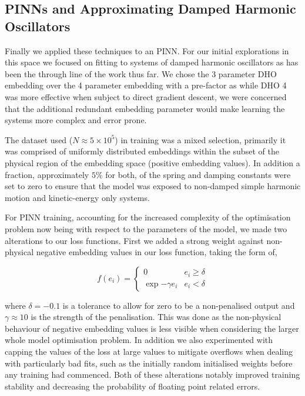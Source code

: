 \subsection{PINNs and Approximating Damped Harmonic Oscillators}

Finally we applied these techniques to an PINN. For our initial explorations in this space we focused on fitting to systems of damped harmonic oscillators as has been the through line of the work thus far. We chose the 3 parameter DHO embedding over the 4 parameter embedding with a pre-factor as while DHO 4 was more effective when subject to direct gradient descent, we were concerned that the additional redundant embedding parameter would make learning the systems more complex and error prone.

The dataset used ($N \approx 5 \times 10^5$) in training was a mixed selection, primarily it was comprised of uniformly distributed embeddings within the subset of the physical region of the embedding space (positive embedding values). In addition a fraction, approximately $5 \%$ for both, of the spring and damping constants were set to zero to ensure that the model was exposed to non-damped simple harmonic motion and kinetic-energy only systems.

For PINN training, accounting for the increased complexity of the optimisation problem now being with respect to the parameters of the model, we made two alterations to our loss functions. First we added a strong weight against non-physical negative embedding values in our loss function, taking the form of,

\begin{equation}
  f(e_i) = \begin{cases}
  	0 & e_i \ge \delta \\
  	\exp{-\gamma e_i} & e_i < \delta 
  \end{cases}
\end{equation}

where $\delta = −0.1$ is a tolerance to allow for zero to be a non-penalised output and $\gamma \approx 10$ is the strength of the penalisation. This was done as the non-physical behaviour of negative embedding values is less visible when considering the larger whole model optimisation problem.
In addition we also experimented with capping the values of the loss at large values to mitigate overflows when dealing with particularly bad fits, such as the initially random initialised weights before any training had commenced. Both of these alterations notably improved training stability and decreasing the probability of floating point related errors.

